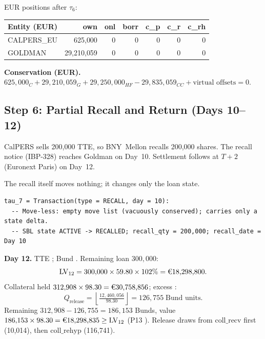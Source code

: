 EUR positions after $\tau_6$:

\begin{center}\small
\begin{tabular}{l r r r r r r}
\toprule
\textbf{Entity (EUR)} & own & onl & borr & c\_p & c\_r & c\_rh \\
\midrule
CALPERS\_EU & 625{,}000 & 0 & 0 & 0 & 0 & 0 \\
GOLDMAN & 29{,}210{,}059 & 0 & 0 & 0 & 0 & 0 \\
\bottomrule
\end{tabular}
\end{center}

\noindent\textbf{Conservation (EUR).} $625{,}000_C + 29{,}210{,}059_G + 29{,}250{,}000_{HF} - 29{,}835{,}059_{CC} + \text{virtual offsets} = 0$. \checkmark

\subsection{Step 6: Partial Recall and Return (Days 10--12)}
\label{sec:eu-step6}

CalPERS sells 200{,}000 TTE, so BNY~Mellon recalls 200{,}000 shares. The recall notice (IBP-328) reaches Goldman on Day~10. Settlement follows at $T+2$ (Euronext Paris) on Day~12.

The recall itself moves nothing; it changes only the loan state.

\begin{lstlisting}
tau_7 = Transaction(type = RECALL, day = 10):
  -- Move-less: empty move list (vacuously conserved); carries only a state delta.
  -- SBL state ACTIVE -> RECALLED; recall_qty = 200,000; recall_date = Day 10
\end{lstlisting}

\noindent\textbf{Day 12.} TTE ; Bund . Remaining loan $300{,}000$:
\[
\mathrm{LV}_{12} = 300{,}000 \times 59.80 \times 102\% = \text{\EUR{18,298,800}}.
\]
Collateral held $312{,}908 \times 98.30 = \text{\EUR{30,758,856}}$; excess :
\[
Q_{\mathrm{release}} = \left\lfloor \tfrac{12{,}460{,}056}{98.30} \right\rfloor = 126{,}755 \;\text{Bund units}.
\]
Remaining $312{,}908 - 126{,}755 = 186{,}153$ Bunds, value $186{,}153 \times 98.30 = \text{\EUR{18,298,835}} \geq \mathrm{LV}_{12}$ (P13 \checkmark). Release draws from $\mathrm{coll\_recv}$ first (10{,}014), then $\mathrm{coll\_rehyp}$ (116{,}741).

